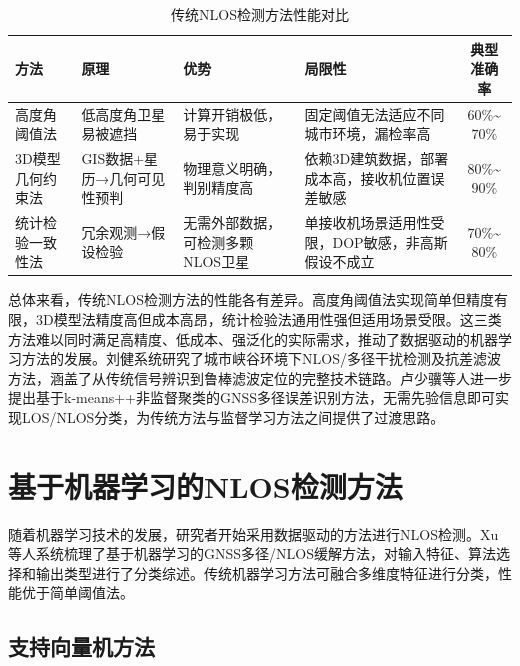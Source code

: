 \begin{table}[htbp]
\centering
\renewcommand{\arraystretch}{1.38}
\setlength{\abovecaptionskip}{0pt}
\setlength{\belowcaptionskip}{10pt}
\caption{传统NLOS检测方法性能对比}
\label{tab:traditional_methods_comparison}
\begin{tabular}{>{\centering\arraybackslash}m{2.2cm}>{\centering\arraybackslash}m{2.8cm}>{\centering\arraybackslash}m{2.8cm}>{\centering\arraybackslash}m{2.8cm}c}
\toprule
\textbf{方法} & \textbf{原理} & \textbf{优势} & \textbf{局限性} & \textbf{典型准确率} \\
\midrule
高度角阈值法 & 低高度角卫星易被遮挡 & 计算开销极低，易于实现 & 固定阈值无法适应不同城市环境，漏检率高 & $60\%$\textasciitilde$70\%$ \\
\midrule
3D模型几何约束法 & GIS数据+星历→几何可见性预判 & 物理意义明确，判别精度高 & 依赖3D建筑数据，部署成本高，接收机位置误差敏感 & $80\%$\textasciitilde$90\%$ \\
\midrule
统计检验一致性法 & 冗余观测→假设检验 & 无需外部数据，可检测多颗NLOS卫星 & 单接收机场景适用性受限，DOP敏感，非高斯假设不成立 & $70\%$\textasciitilde$80\%$ \\
\bottomrule
\end{tabular}
\end{table}

    总体来看，传统NLOS检测方法的性能各有差异。高度角阈值法实现简单但精度有限，3D模型法精度高但成本高昂，统计检验法通用性强但适用场景受限。这三类方法难以同时满足高精度、低成本、强泛化的实际需求，推动了数据驱动的机器学习方法的发展。刘健\cite{liu2023urban}系统研究了城市峡谷环境下NLOS/多径干扰检测及抗差滤波方法，涵盖了从传统信号辨识到鲁棒滤波定位的完整技术链路。卢少骥等人\cite{lu2025unsupervised}进一步提出基于k-means++非监督聚类的GNSS多径误差识别方法，无需先验信息即可实现LOS/NLOS分类，为传统方法与监督学习方法之间提供了过渡思路。

\section{基于机器学习的NLOS检测方法}

    随着机器学习技术的发展，研究者开始采用数据驱动的方法进行NLOS检测。Xu等人\cite{xu2024ml_gnss}系统梳理了基于机器学习的GNSS多径/NLOS缓解方法，对输入特征、算法选择和输出类型进行了分类综述。传统机器学习方法可融合多维度特征进行分类，性能优于简单阈值法。

\subsection{支持向量机方法}

